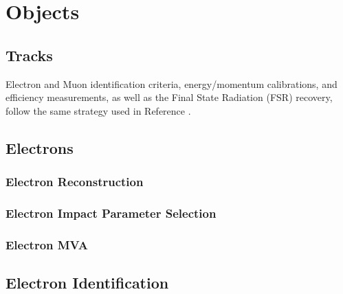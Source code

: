 

\section{Objects}
\subsection{Tracks}
\label{sec:tracks}

Electron and Muon identification criteria, energy/momentum calibrations, and efficiency measurements, as well as the Final State Radiation (FSR) recovery, follow the same strategy used in Reference . %
\subsection{Electrons}
\subsubsection{Electron Reconstruction}
\label{sec:eleReco}

\subsubsection{Electron Impact Parameter Selection}
\label{sec:eleSIP}

\subsubsection{Electron MVA}
\label{sec:eleMVA}

\subsection{Electron Identification}
\label{sec:ele_selection}

%
